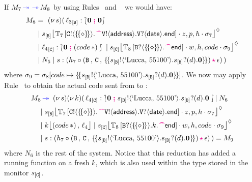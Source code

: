 \documentclass[runningheads,plain]{llncs}
\begin{document}
If $M_7 \textcolor{blue}{\,\twoheadrightarrow\,} \textcolor{blue}{\,\twoheadrightarrow\,} M_8$ by using Rules~ and ~
we would have:
\begin{align*}
M_8 & = ~   \news{s}(\,  \np{\key{{\loc_3}}{\pB}}{ \conf{\inact}{\inact}} 
\\
& \Par \hmoni{\ep{s}{\pB}}{\myctxr{\ctx{T}_7}{\ltout{C}{\thunkt}{\past\ltout{\pS}{\mathsf{address}}{\ltinp{\pS}{\mathsf{date}}{\lend}}}}}{z,p,h}{\store_7} 
\\
& \Par \np{\key{{\loc_4}}{\pC}}{ \conf{\inact}{(\appl{code}{\dummyn}) }} 
 \Par 
\hmoni{\ep{s}{\pC}}{\myctxr{\ctx{T}_8}{ \ltinp{B}{\thunkt}{\past\lend}}}{w,h,code}{\store_9} 
\\
& 
\Par N_5 \Par \codah{s}{h_7 \cons \valueq{\pB}{\pC}{\thunkp{\bout{\epB}{\text{`Lucca, 55100'}}\binp{\epB}{d}\inact}}}{\emp}{}~) 
\end{align*}
where
$\sigma_9 = \sigma_8 [code\mapsto \{\!\{s_{[\mathtt{B}]} ! \langle \text{`Lucca, 55100'} \rangle .s_{[\mathtt{B}]} ? (d) .\mathbf{0}\}\!\}]$.
We now may apply Rule~ to obtain the actual code sent from \pB to \pC:
\begin{align*}
M_8 & \fw ~   \news{s}\news{k}(\,  
\np{\key{{\loc_4}}{\pC}}{\conf{\inact}{\bout{\epB}{\text{`Lucca, 55100'}}\binp{\epB}{d}\inact}} 
\!\!  \Par N_6 
\\
& \!\!\Par \hmoni{\ep{s}{\pB}}{\myctxr{\ctx{T}_7}{\ltout{C}{\thunkt}{\past\ltout{\pS}{\mathsf{address}}{\ltinp{\pS}{\mathsf{date}}{\lend}}}}}{z,p,h}{\store_7} 
\\
& \!\!\Par 
\mem{k}{(\appl{code}{\dummyn})}{{\loc_4}} 
\Par 
\hmoni{\ep{s}{\pC}}{\myctxr{\ctx{T}_8}{ \ltinp{B}{\thunkt}{k.\past\lend}}}{w,h,code}{\store_9} 
\\
& 
\!\!\Par \codah{s}{h_7 \cons \valueq{\pB}{\pC}{\thunkp{\bout{\epB}{\text{`Lucca, 55100'}}\binp{\epB}{d}\inact}}}{\emp}{}~) 
= M_9
\end{align*}
where $N_6$ is the rest of the system. 
Notice that this reduction has added a running function on a fresh 
$k$, which is also used within the type stored in the monitor $s_{[\mathtt{C}]}$.
\end{document}
